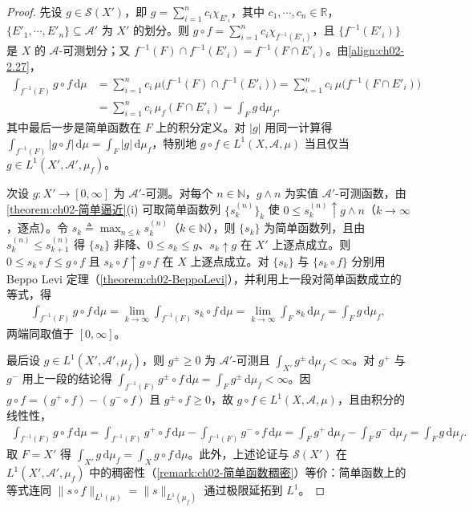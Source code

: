 \documentclass[../../main.tex]{subfiles}%
\begin{document}
\begin{proof}
先设 $g\in\mathscr S(X')$，即 $g=\sum_{i=1}^nc_i\chi_{E'_i}$，其中 $c_1,\cdots ,c_n\in\mathbb R$，$\{E'_1,\cdots ,E'_n\}\subseteq\mathscr A'$ 为 $X'$ 的划分。则 $g\circ f=\sum_{i=1}^nc_i\chi_{f^{-1}(E'_i)}$，且 $\{f^{-1}(E'_i)\}$ 是 $X$ 的 $\mathscr A$-可测划分；又 $f^{-1}(F)\cap f^{-1}(E'_i)=f^{-1}(F\cap E'_i)$。由\eqref{align:ch02-2.27}，
\begin{align*}
\int_{f^{-1}(F)}g\circ f\,\mathrm{d}\mu
&=\sum_{i=1}^nc_i\,\mu\bigl(f^{-1}(F)\cap f^{-1}(E'_i)\bigr)
=\sum_{i=1}^nc_i\,\mu\bigl(f^{-1}(F\cap E'_i)\bigr)\\
&=\sum_{i=1}^nc_i\,\mu_f(F\cap E'_i)=\int_Fg\,\mathrm{d}\mu_f,
\end{align*}
其中最后一步是简单函数在 $F$ 上的积分定义。对 $|g|$ 用同一计算得 $\int_{f^{-1}(F)}|g\circ f|\,\mathrm{d}\mu=\int_F|g|\,\mathrm{d}\mu_f$，特别地 $g\circ f\in L^1(X,\mathscr A,\mu)$ 当且仅当 $g\in L^1(X',\mathscr A',\mu_f)$。

次设 $g:X'\to[0,\infty]$ 为 $\mathscr A'$-可测。对每个 $n\in\mathbb N$，$g\wedge n$ 为实值 $\mathscr A'$-可测函数，由\cref{theorem:ch02-简单逼近}(i) 可取简单函数列 $\{s_k^{(n)}\}_k$ 使 $0\leqslant s_k^{(n)}\uparrow g\wedge n$（$k\to\infty$，逐点）。令 $s_k\triangleq\max_{n\leqslant k}s_k^{(n)}$（$k\in\mathbb N$），则 $\{s_k\}$ 为简单函数列，且由 $s_k^{(n)}\leqslant s_{k+1}^{(n)}$ 得 $\{s_k\}$ 非降、$0\leqslant s_k\leqslant g$、$s_k\uparrow g$ 在 $X'$ 上逐点成立。则 $0\leqslant s_k\circ f\leqslant g\circ f$ 且 $s_k\circ f\uparrow g\circ f$ 在 $X$ 上逐点成立。对 $\{s_k\}$ 与 $\{s_k\circ f\}$ 分别用 Beppo Levi 定理（\cref{theorem:ch02-BeppoLevi}），并利用上一段对简单函数成立的等式，得
\begin{align*}
\int_{f^{-1}(F)}g\circ f\,\mathrm{d}\mu
=\lim_{k\to\infty}\int_{f^{-1}(F)}s_k\circ f\,\mathrm{d}\mu
=\lim_{k\to\infty}\int_Fs_k\,\mathrm{d}\mu_f
=\int_Fg\,\mathrm{d}\mu_f,
\end{align*}
两端同取值于 $[0,\infty]$。

最后设 $g\in L^1(X',\mathscr A',\mu_f)$，则 $g^\pm\geqslant0$ 为 $\mathscr A'$-可测且 $\int_{X'}g^\pm\,\mathrm{d}\mu_f<\infty$。对 $g^+$ 与 $g^-$ 用上一段的结论得 $\int_{f^{-1}(F)}g^\pm\circ f\,\mathrm{d}\mu=\int_Fg^\pm\,\mathrm{d}\mu_f<\infty$。因 $g\circ f=(g^+\circ f)-(g^-\circ f)$ 且 $g^\pm\circ f\geqslant0$，故 $g\circ f\in L^1(X,\mathscr A,\mu)$，且由积分的线性性，
\begin{align*}
\int_{f^{-1}(F)}g\circ f\,\mathrm{d}\mu
=\int_{f^{-1}(F)}g^+\circ f\,\mathrm{d}\mu-\int_{f^{-1}(F)}g^-\circ f\,\mathrm{d}\mu
=\int_Fg^+\,\mathrm{d}\mu_f-\int_Fg^-\,\mathrm{d}\mu_f
=\int_Fg\,\mathrm{d}\mu_f.
\end{align*}
取 $F=X'$ 得 $\int_{X'}g\,\mathrm{d}\mu_f=\int_Xg\circ f\,\mathrm{d}\mu$。此外，上述论证与 $\mathscr S(X')$ 在 $L^1(X',\mathscr A',\mu_f)$ 中的稠密性（\cref{remark:ch02-简单函数稠密}）等价：简单函数上的等式连同 $\|s\circ f\|_{L^1(\mu)}=\|s\|_{L^1(\mu_f)}$ 通过极限延拓到 $L^1$。
\end{proof}
\end{document}
